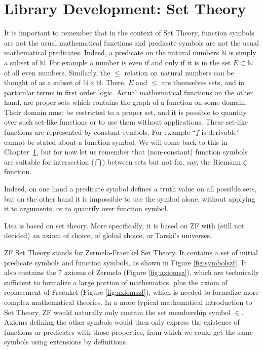 
\chapter{Library Development: Set Theory}
\label{chapt:settheory}

It is important to remember that in the context of Set Theory, function symbols are not the usual mathematical functions and predicate symbols are not the usual mathematical predicates. Indeed, a predicate on the natural numbers $\mathbb N$ is simply a subset of $\mathbb N$. For example a number is even if and only if it is in the set $E \subset \mathbb N$ of all even numbers. Similarly, the $\leq$ relation on natural numbers can be thought of as a subset of $\mathbb N \times \mathbb N$. There, $E$ and $\leq$ are themselves sets, and in particular terms in first order logic.
Actual mathematical functions on the other hand, are proper sets which contains the graph of a function on some domain. Their domain must be restricted to a proper set, and it is possible to quantify over such set-like functions or to use them without applications. These set-like functions are represented by constant symbols.  For example ``$f$ is derivable'' cannot be stated about a function symbol. We will come back to this in Chapter~\ref{chapt:settheory}, but for now let us remember that (non-constant) function symbols are suitable for intersection ($\bigcap$) between sets but not for, say, the Riemann $\zeta$ function.

Indeed, on one hand a predicate symbol defines a truth value on all possible sets, but on the other hand it is impossible to use the symbol alone, without applying it to arguments, or to quantify over function symbol.

Lisa is based on set theory. More specifically, it is based on ZF with (still not decided) an axiom of choice, of global choice, or Tarski's universes.

ZF Set Theory stands for Zermelo-Fraenkel Set Theory. It contains a set of initial predicate symbols and function symbols, as shown in Figure \ref{fig:symbolszf}. It also contains the 7 axioms of Zermelo (Figure \ref{fig:axiomsz}), which are technically sufficient to formalize a large portion of mathematics, plus the axiom of replacement of Fraenkel (Figure \ref{fig:axiomszf}), which is needed to formalize more complex mathematical theories.
In a more typical mathematical introduction to Set Theory, ZF would naturally only contain the set membership symbol $\in$. Axioms defining the other symbols would then only express the existence of functions or predicates with those properties, from which we could get the same symbols using extensions by definitions.

